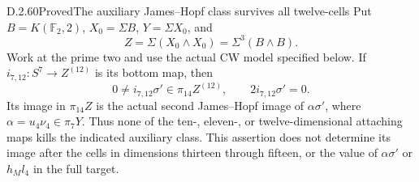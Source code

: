 \begin{claim}{D.2.60}{Proved}{The auxiliary James--Hopf class survives all twelve-cells}
Put $B=K(\mathbb F_2,2)$, $X_0=\Sigma B$, $Y=\Sigma X_0$, and
\[
 Z=\Sigma(X_0\wedge X_0)=\Sigma^3(B\wedge B).
 \tag{D.2.60a}
\]
Work at the prime two and use the actual CW model specified below.
If $i_{7,12}:S^7\to Z^{(12)}$ is its bottom map, then
\[
 0\ne i_{7,12}\sigma'\in\pi_{14}Z^{(12)},\qquad
                         2i_{7,12}\sigma'=0.
 \tag{D.2.60b}
\]
Its image in $\pi_{14}Z$ is the actual second James--Hopf image
of $\alpha\sigma'$, where $\alpha=u_4\nu_4\in\pi_7Y$.
Thus none of the ten-, eleven-, or twelve-dimensional attaching
maps kills the indicated auxiliary class.  This assertion does
not determine its image after the cells in dimensions thirteen
through fifteen, or the value of $\alpha\sigma'$ or $h_Ml_4$ in
the full target.
\end{claim}

